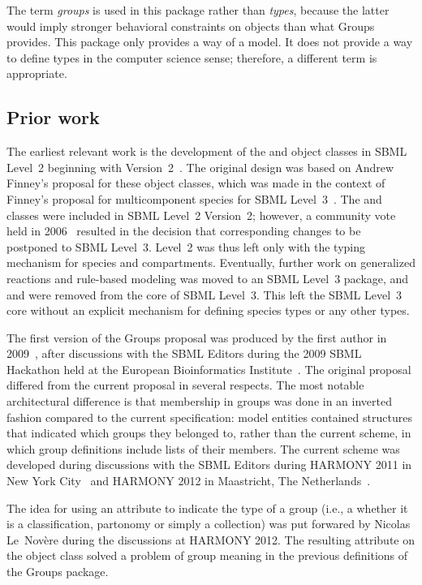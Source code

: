 The term \emph{groups} is used in this package rather than \emph{types}, because the latter would imply stronger behavioral constraints on objects than what Groups provides. This package only provides a way of  a model.  It does not provide a way to define types in the computer science sense; therefore, a different term is appropriate.


\subsection{Prior work}

The earliest relevant work is the development of the \CompartmentType and \SpeciesType object classes in SBML Level~2 beginning with Version~2~\citep{l2v2}. The original design was based on Andrew Finney's proposal for these object classes, which was made in the context of Finney's proposal for multicomponent species for SBML Level~3~\citep{finney_2004}.  The \SpeciesType and \CompartmentType classes were included in SBML Level~2 Version~2; however, a community vote held in 2006~\citep{vote_2006b} resulted in the decision that corresponding changes to \Reaction be postponed to SBML Level~3.  Level~2 was thus left only with the typing mechanism for species and compartments.  Eventually, further work on generalized reactions and rule-based modeling was moved to an SBML Level~3 package, and \SpeciesType and \CompartmentType were removed from the core of SBML Level~3.  This left the SBML Level~3 core without an explicit mechanism for defining species types or any other types.

The first version of the Groups proposal was produced by the first author in 2009~\citep{hucka_2009}, after discussions with the SBML Editors during the 2009 SBML Hackathon held at the European Bioinformatics Institute~\citep{sbml_hackathon_2009}.  The original proposal differed from the current proposal in several respects. The most notable architectural difference is that membership in groups was done in an inverted fashion compared to the current specification: model entities contained structures that indicated which groups they belonged to, rather than the current scheme, in which group definitions include lists of their members.  The current scheme was developed during discussions with the SBML Editors during HARMONY 2011 in New York City~\citep{harmony_2011} and HARMONY 2012 in Maastricht, The Netherlands~\citep{harmony_2012}.

The idea for using an attribute to indicate the type of a group (i.e., a whether it is a classification, partonomy or simply a collection) was put forwared by Nicolas Le~Nov\`{e}re during the discussions at HARMONY 2012.  The resulting attribute  on the \Group object class solved a problem of group meaning in the previous definitions of the Groups package.

